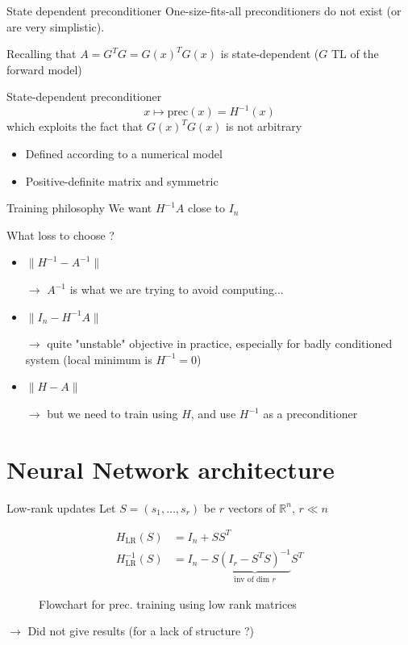\documentclass[10pt,aspectratio=169]{beamer}
\begin{document}
\begin{frame}{State dependent preconditioner}
 One-size-fits-all preconditioners do not exist (or are very simplistic).
 
 
 Recalling that $A = G^TG = G(x)^TG(x)$ is state-dependent ($G$ TL of the forward model)
 
 \begin{block}{State-dependent preconditioner}
   \begin{equation}
     x \longmapsto \text{prec}(x) = H^{-1}(x)
 \end{equation}
 which exploits the fact that $G(x)^TG(x)$ is not arbitrary
 \begin{itemize}
     \item Defined according to a numerical model
     \item Positive-definite matrix and symmetric
 \end{itemize}
 \end{block}
\end{frame}

\begin{frame}{Training philosophy}
We want $H^{-1}A$ close to $I_n$

What loss to choose ?
    \begin{itemize}
        \item $\|H^{-1} - A^{-1}\|$
        
        
        $\rightarrow$ $A^{-1}$ is what we are trying to avoid computing...
        \item $\|I_n - H^{-1}A\|$
        
      $\rightarrow$  quite "unstable" objective in practice, especially for badly conditioned system (local minimum is $H^{-1} = 0$)
        \item $\|H - A\|$
        
        $\rightarrow$ but we need to train using $H$, and use $H^{-1}$ as a preconditioner
    \end{itemize}
\end{frame}

\section{Neural Network architecture}
\begin{frame}{Low-rank updates}
Let $S=(s_1, \dots, s_r)$ be $r$ vectors of $\mathbb{R}^n$, $r\ll n$

\begin{align}
    H_{\text{LR}}(S) &= I_n + SS^T \\
    H^{-1}_{\text{LR}}(S) &= I_n - S \underbrace{\left(I_r - S^TS \right)^{-1}}_{\text{inv of dim } r} S^T
\end{align} 
    \begin{figure}
    \centering
    \resizebox{0.5\textwidth}{!}{    
    }
    \caption{Flowchart for prec. training using low rank matrices}
    \label{fig:archi_nn_lowrank}
\end{figure}
$\rightarrow$ Did not give results (for a lack of structure ?)
\end{frame}
\end{document}
